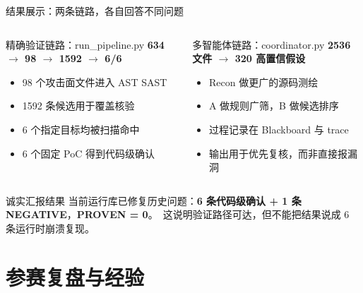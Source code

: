 \documentclass[10pt,aspectratio=169]{beamer}
\newcommand{\result}[1]{\textcolor{accentgreen}{\textbf{#1}}}
\newcommand{\risk}[1]{\textcolor{accentorange}{\textbf{#1}}}
\begin{document}
\begin{frame}{结果展示：两条链路，各自回答不同问题}
  \begin{columns}[T,onlytextwidth]
    \begin{block}{精确验证链路：run\_pipeline.py}
      \centering
      \large \result{634 $\rightarrow$ 98 $\rightarrow$ 1592 $\rightarrow$ 6/6}
      \vspace{0.5em}
      \begin{itemize}\small
        \item 98 个攻击面文件进入 AST SAST
        \item 1592 条候选用于覆盖核验
        \item 6 个指定目标均被扫描命中
        \item 6 个固定 PoC 得到代码级确认
      \end{itemize}
    \end{block}
    \begin{block}{多智能体链路：coordinator.py}
      \centering
      \large \result{2536 文件 $\rightarrow$ 320 高置信假设}
      \vspace{0.5em}
      \begin{itemize}\small
        \item Recon 做更广的源码测绘
        \item A 做规则广筛，B 做候选排序
        \item 过程记录在 Blackboard 与 trace
        \item 输出用于优先复核，而非直接报漏洞
      \end{itemize}
    \end{block}
  \end{columns}

  \vspace{0.7em}
  \begin{alertblock}{诚实汇报结果}
    当前运行库已修复历史问题：\result{6 条代码级确认 + 1 条 NEGATIVE}，\risk{PROVEN = 0}。\
    这说明验证路径可达，但不能把结果说成 6 条运行时崩溃复现。
  \end{alertblock}
\end{frame}

\section{参赛复盘与经验}
\end{document}
